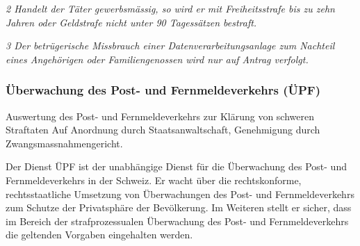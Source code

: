 \textit{2 Handelt der Täter gewerbsmässig, so wird er mit Freiheitsstrafe bis zu zehn Jahren oder Geldstrafe nicht unter 90 Tagessätzen bestraft.}

\textit{3 Der betrügerische Missbrauch einer Datenverarbeitungsanlage zum Nachteil eines Angehörigen oder Familiengenossen wird nur auf Antrag verfolgt.
}

\subsubsection{Überwachung des Post- und Fernmeldeverkehrs (ÜPF)}

Auswertung des Post- und Fernmeldeverkehrs zur Klärung von schweren Straftaten
Auf Anordnung durch Staatsanwaltschaft, Genehmigung durch Zwangsmassnahmengericht.

Der Dienst ÜPF ist der unabhängige Dienst für die Überwachung des Post- und Fernmeldeverkehrs in der Schweiz. Er wacht über die rechtskonforme, rechtsstaatliche Umsetzung von Überwachungen des Post- und Fernmeldeverkehrs zum Schutze der Privatsphäre der Bevölkerung. Im Weiteren stellt er sicher, dass im Bereich der strafprozessualen Überwachung des Post- und Fernmeldeverkehrs die geltenden Vorgaben eingehalten werden.

